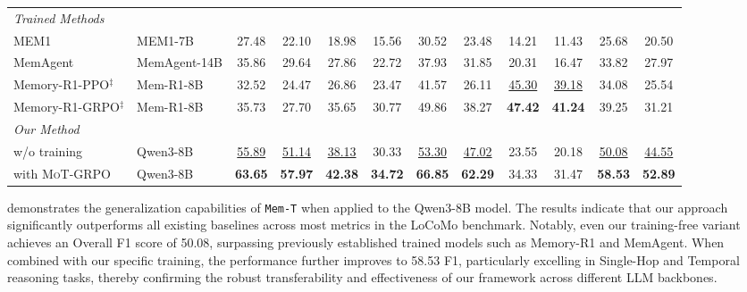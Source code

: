 \documentclass[11pt, a4paper]{lumia}
\newcommand{\ourmethod}{{\texttt{Mem-T}}\xspace} %
\newcommand{\ourtrain}{{\textsc{MoT-GRPO}}\xspace} %
\begin{document}
\begin{table}[!ht]
{\begin{tabular}{llcccccccccc}
        \midrule
        \multicolumn{12}{l}{\textit{Trained Methods}} \\
        MEM1  & MEM1-7B & 27.48 & 22.10 & 18.98 & 15.56 & 30.52 & 23.48 & 14.21 & 11.43 & 25.68 & 20.50 \\
        MemAgent & MemAgent-14B & 35.86 & 29.64 & 27.86 & 22.72 & 37.93 & 31.85 & 20.31 & 16.47 & 33.82 & 27.97 \\
        Memory-R1-PPO$^{\ddagger}$  & Mem-R1-8B & 32.52 & 24.47 & 26.86 & 23.47 & 41.57 & 26.11 & \underline{45.30} & \underline{39.18} & 34.08 & 25.54 \\
        Memory-R1-GRPO$^{\ddagger}$  & Mem-R1-8B & 35.73 & 27.70 & 35.65 & 30.77 & 49.86 & 38.27 & \textbf{47.42} & \textbf{41.24} & 39.25 & 31.21 \\
        \midrule
        \multicolumn{12}{l}{\textit{Our Method}} \\
        w/o training & Qwen3-8B & \underline{55.89} & \underline{51.14} & \underline{38.13} & 30.33 & \underline{53.30} & \underline{47.02} & 23.55 & 20.18 & \underline{50.08} & \underline{44.55} \\
        with \ourtrain & Qwen3-8B & \textbf{63.65} & \textbf{57.97} & \textbf{42.38} & \textbf{34.72} & \textbf{66.85} & \textbf{62.29} & 34.33 & 31.47 & \textbf{58.53} & \textbf{52.89} \\
        \bottomrule
    \end{tabular}%
    }
\end{table}

 demonstrates the generalization capabilities of \ourmethod when applied to the Qwen3-8B model. The results indicate that our approach significantly outperforms all existing baselines across most metrics in the LoCoMo benchmark. Notably, even our training-free variant achieves an Overall F1 score of 50.08, surpassing previously established trained models such as Memory-R1 and MemAgent. When combined with our specific training, the performance further improves to 58.53 F1, particularly excelling in Single-Hop and Temporal reasoning tasks, thereby confirming the robust transferability and effectiveness of our framework across different LLM backbones.
\end{document}
